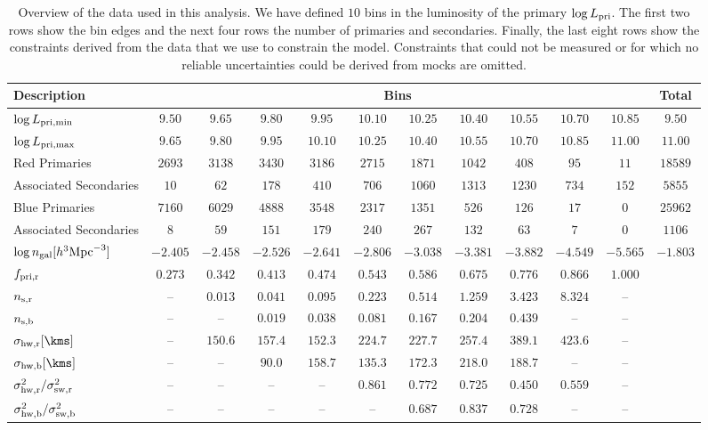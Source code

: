 \documentclass[fleqn,usenatbib,useAMS]{mnras}
\begin{document}
\begin{table}
	\begin{tabular}{lccccccccccc}
		\hline
		Description & \multicolumn{10}{c}{Bins} & Total\\
		\hline\hline
		$\log L_{\rm pri, min}$ & $9.50$ & $9.65$ & $9.80$ & $9.95$ & $10.10$ & $10.25$ & $10.40$ & $10.55$ & $10.70$ & $10.85$ & $9.50$ \\
		$\log L_{\rm pri, max}$ & $9.65$ & $9.80$ & $9.95$ & $10.10$ & $10.25$ & $10.40$ & $10.55$ & $10.70$ & $10.85$ & $11.00$ & $11.00$ \\
		\hline
		Red Primaries & $2693$ & $3138$ & $3430$ & $3186$ & $2715$ & $1871$ & $1042$ & $408$ & $95$ & $11$ & $18589$ \\
		Associated Secondaries & $10$ & $62$ & $178$ & $410$ & $706$ & $1060$ & $1313$ & $1230$ & $734$ & $152$ & $5855$ \\
		Blue Primaries & $7160$ & $6029$ & $4888$ & $3548$ & $2317$ & $1351$ & $526$ & $126$ & $17$ & $0$ & $25962$ \\
		Associated Secondaries & $8$ & $59$ & $151$ & $179$ & $240$ & $267$ & $132$ & $63$ & $7$ & $0$ & $1106$ \\
		\hline
		$\log n_{\rm gal} [h^{3} \mathrm{Mpc}^{-3}]$ & $-2.405$ & $-2.458$ & $-2.526$ & $-2.641$ & $-2.806$ & $-3.038$ & $-3.381$ & $-3.882$ & $-4.549$ & $-5.565$ & $-1.803$ \\
		$f_{\rm pri, r}$ & $0.273$ & $0.342$ & $0.413$ & $0.474$ & $0.543$ & $0.586$ & $0.675$ & $0.776$ & $0.866$ & $1.000$ &  \\
		$n_{\rm s, r}$ & -- & $0.013$ & $0.041$ & $0.095$ & $0.223$ & $0.514$ & $1.259$ & $3.423$ & $8.324$ & -- &  \\
		$n_{\rm s, b}$ & -- & -- & $0.019$ & $0.038$ & $0.081$ & $0.167$ & $0.204$ & $0.439$ & -- & -- &  \\
		$\sigma_{\rm hw, r} [\kms]$ & -- & $150.6$ & $157.4$ & $152.3$ & $224.7$ & $227.7$ & $257.4$ & $389.1$ & $423.6$ & -- &  \\
		$\sigma_{\rm hw, b} [\kms]$ & -- & -- & $90.0$ & $158.7$ & $135.3$ & $172.3$ & $218.0$ & $188.7$ & -- & -- &  \\
		$\sigma_{\rm hw, r}^2 / \sigma_{\rm sw, r}^2$ & -- & -- & -- & -- & $0.861$ & $0.772$ & $0.725$ & $0.450$ & $0.559$ & -- &  \\
		$\sigma_{\rm hw, b}^2 / \sigma_{\rm sw, b}^2$ & -- & -- & -- & -- & -- & $0.687$ & $0.837$ & $0.728$ & -- & -- &  \\
		\hline
	\end{tabular}
	\caption{Overview of the data used in this analysis. We have defined $10$ bins in the luminosity of the primary $\log L_{\rm pri}$. The first two rows show the bin edges and the next four rows the number of primaries and secondaries. Finally, the last eight rows show the constraints derived from the data that we use to constrain the model. Constraints that could not be measured or for which no reliable uncertainties could be derived from mocks are omitted.}
	\label{tab:data}
\end{table}
\end{document}
